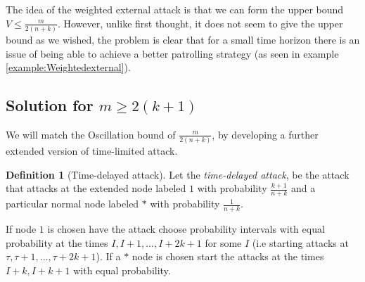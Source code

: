 \documentclass[a4paper,10pt]{article}
\theoremstyle{definition}
\newtheorem{definition}[theorem]{Definition}
\theoremstyle{definition}
\theoremstyle{remark}
\theoremstyle{definition}
\begin{document}
The idea of the weighted external attack is that we can form the upper bound $V \leq \frac{m}{2(n+k)}$. However, unlike first thought, it does not seem to give the upper bound as we wished, the problem is clear that for a small time horizon there is an issue of being able to achieve a better patrolling strategy (as seen in example \ref{example:Weightedexternal}).



\subsection{Solution for $m \geq 2(k+1)$}

We will match the Oscillation bound of $\frac{m}{2(n+k)}$, by developing a further extended version of time-limited attack.

\begin{definition}[Time-delayed attack]
Let the \textit{time-delayed attack}, be the attack that attacks at the extended node labeled $1$ with probability $\frac{k+1}{n+k}$ and a particular normal node labeled $*$ with probability $\frac{1}{n+k}$.

If node $1$ is chosen have the attack choose probability intervals with equal probability at the times $I,I+1,...,I+2k+1$ for some $I$ (i.e starting attacks at $\tau, \tau+1,...,\tau+2k+1$). If a $*$ node is chosen start the attacks at the times $I+k,I+k+1$ with equal probability.
\end{definition}

\begin{myfigure}
\begin{center}
\end{center}
\end{myfigure}
\end{document}
